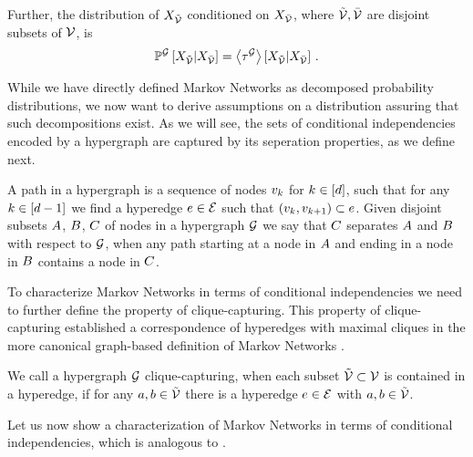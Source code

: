 Further, the distribution of $X_{\tilde{\mathcal{V}}}$ conditioned on $X_{\bar{\mathcal{V}}}$, where $\tilde{\mathcal{V}},\bar{\mathcal{V}}$ are disjoint subsets of $\mathcal{V}$, is
\begin{align*}
    \mathbb{P}^{\mathcal{G}}\left[X_{\tilde{\mathcal{V}}}|X_{\bar{\mathcal{V}}}\right]
    = \left\langle \tau^{\mathcal{G}}\right\rangle \left[ X_{\tilde{\mathcal{V}}} | X_{\bar{\mathcal{V}}} \right] \, .
\end{align*}

While we have directly defined Markov Networks as decomposed probability distributions, we now want to derive assumptions on a distribution assuring that such decompositions exist.
As we will see, the sets of conditional independencies encoded by a hypergraph are captured by its seperation properties, as we define next.

\begin{definition}
    A path in a hypergraph is a sequence of nodes $v_{k}$ for $k\in[d]$, such that for any $k\in[d-1]$ we find a hyperedge $e\in\mathcal{E}$ such that $(v_{k}, v_{k+1})\subset e$.
    Given disjoint subsets $A$, $B$, $C$ of nodes in a hypergraph $\mathcal{G}$ we say that $C$ separates $A$ and $B$ with respect to $\mathcal{G}$, when any path starting at a node in $A$ and ending in a node in $B$ contains a node in $C$.
\end{definition}

To characterize Markov Networks in terms of conditional independencies we need to further define the property of clique-capturing.
This property of clique-capturing established a correspondence of hyperedges with maximal cliques in the more canonical graph-based definition of Markov Networks \cite{koller_probabilistic_2009}.

\begin{definition}
    \label{def:ccHypergraph}
    We call a hypergraph $\mathcal{G}$ clique-capturing, when each subset $\tilde{\mathcal{V}}\subset\mathcal{V}$ is contained in a hyperedge, if for any $a,b\in\tilde{\mathcal{V}}$ there is a hyperedge $e\in\mathcal{E}$ with $a,b\in\tilde{\mathcal{V}}$.
\end{definition}

Let us now show a characterization of Markov Networks in terms of conditional independencies, which is analogous to .

